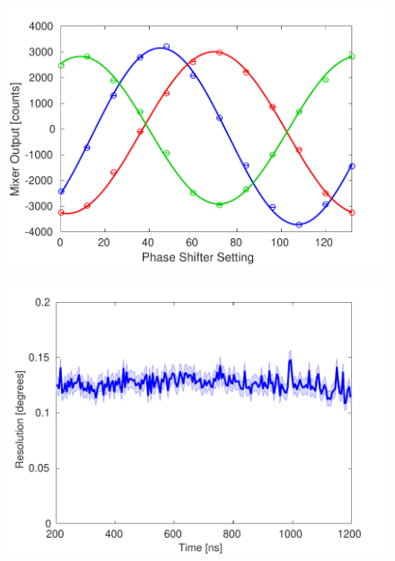 \documentclass[%
 reprint,
 superscriptaddress,
 amsmath,
 amssymb,
 prstab,
]{revtex4-1}
\begin{document}

\begin{figure}
	\includegraphics[width=\columnwidth]{figs/hw/phMonCal}%
	\caption{\label{f:phMonCal}
	}
\end{figure}

\begin{figure}
	\includegraphics[width=\columnwidth]{figs/hw/phMonRes}%
	\caption{\label{f:phMonRes}
	}
\end{figure}
\end{document}
